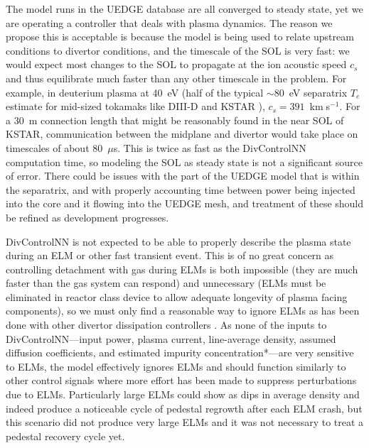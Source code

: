 \documentclass[10pt]{iopart}
\begin{document}
The model runs in the UEDGE database are all converged to steady state, yet we are operating a controller that deals with plasma dynamics.
The reason we propose this is acceptable is because the model is being used to relate upstream conditions to divertor conditions, and the timescale of the SOL is very fast: we would expect most changes to the SOL to propagate at the ion acoustic speed $c_s$ and thus equilibrate much faster than any other timescale in the problem.
For example, in deuterium plasma at 40~eV (half of the typical $\sim80$~eV separatrix $T_e$ estimate for mid-sized tokamaks like \mbox{DIII-D} and KSTAR \cite{stangeby_2015_nf}), $c_s=391$~km$\;$s$^{-1}$.
For a 30~m connection length that might be reasonably found in the near SOL of KSTAR, communication between the midplane and divertor would take place on timescales of about 80~$\mu$s.
This is twice as fast as the DivControlNN computation time, so modeling the SOL as steady state is not a significant source of error.
There could be issues with the part of the UEDGE model that is within the separatrix, and with properly accounting time between power being injected into the core and it flowing into the UEDGE mesh, and treatment of these should be refined as development progresses.

DivControlNN is not expected to be able to properly describe the plasma state during an ELM or other fast transient event.
This is of no great concern as controlling detachment with gas during ELMs is both impossible (they are much faster than the gas system can respond) and unnecessary (ELMs must be eliminated in reactor class device to allow adequate longevity of plasma facing components), so we must only find a reasonable way to ignore ELMs as has been done with other divertor dissipation controllers \cite{Eldon_2017_NF,Eldon_2021_NME}.
As none of the inputs to DivControlNN---input power, plasma current, line-average density, assumed diffusion coefficients, and estimated impurity concentration*---are very sensitive to ELMs, the model effectively ignores ELMs and should function similarly to other control signals where more effort has been made to suppress perturbations due to ELMs.
Particularly large ELMs could show as dips in average density and indeed produce a noticeable cycle of pedestal regrowth after each ELM crash, but this scenario did not produce very large ELMs and it was not necessary to treat a pedestal recovery cycle yet.
\end{document}
